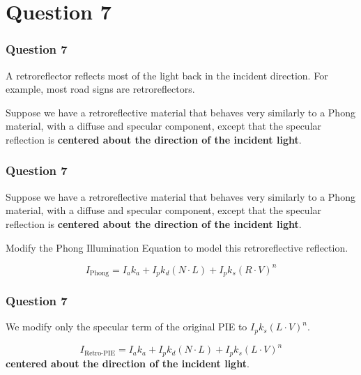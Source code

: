 \documentclass{beamer}
\begin{document}
\section{Question 7}

\begin{frame}
    \frametitle{Question 7}

    A retroreflector reflects most of the light back in the incident direction. 
    For example, most road signs are retroreflectors. 

    \vspace*{1em}

    Suppose we have a retroreflective material that behaves very similarly to a Phong material,
    with a diffuse and specular component, except that the specular reflection is \textbf{centered 
    about the direction of the incident light}.

    \vspace*{1em}

\end{frame}

\begin{frame}
    \frametitle{Question 7}


    \begin{tcolorbox}
        Suppose we have a retroreflective material that behaves very similarly to a Phong material,
        with a diffuse and specular component, except that the specular reflection is \textbf{centered 
        about the direction of the incident light}.
    \end{tcolorbox}

    \vspace*{1em}

    Modify the Phong Illumination Equation to model this retroreflective reflection. 

    \begin{equation*}
        I_\text{Phong} = I_a k_a + I_p k_d  (N \cdot L) + I_p k_s (R \cdot V)^n
    \end{equation*}

\end{frame}

\begin{frame}
    \frametitle{Question 7}

    We modify only the specular term of the original PIE to $I_p k_s (L \cdot V)^n$.

    \begin{tcolorbox}
        \begin{equation*}
            I_\text{Retro-PIE} = I_a k_a + I_p k_d  (N \cdot L) + I_p k_s (L \cdot V)^n
        \end{equation*}
        \textbf{centered about the direction of the incident light}.
    \end{tcolorbox}

\end{frame}
\end{document}
